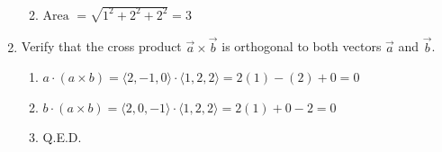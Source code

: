 \documentclass[letter,11pt]{article}
\begin{document}
\begin{enumerate}[label=\Alph*.]
\begin{enumerate}
\begin{align*}
        \end{align*}
        \item $\text{Area } = \sqrt{1^2+ 2^2+2^2} = 3$
    \end{enumerate}
    \item Verify that the cross product $\vec{a} \times \vec{b}$ is orthogonal to both vectors $\vec{a}$ and $\vec{b}$.
    \begin{enumerate}
        \item $a\cdot (a\times b)= \langle 2, -1, 0\rangle \cdot \langle 1,2,2\rangle = 2(1)-(2)+0 = 0$
        \item $b\cdot (a\times b)= \langle 2, 0, -1\rangle \cdot \langle 1,2,2\rangle = 2(1)+0 -2 = 0$
        \item Q.E.D.
    \end{enumerate}
\end{enumerate}
\end{document}
